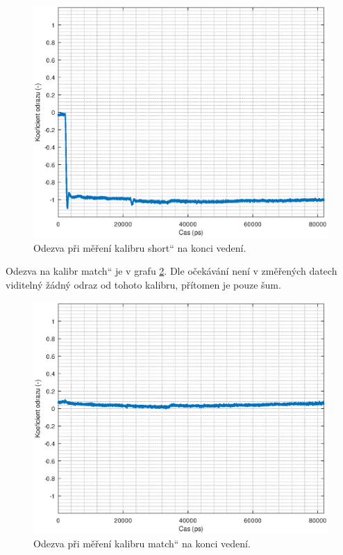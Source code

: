 \begin{figure}[htbp]
\includegraphics[width=\textwidth,keepaspectratio]{images/self-measurements/measured_short.eps}\caption{Odezva při měření kalibru \quotedblbase short\textquotedblleft{} na konci vedení.}\label{measured_short}
\end{figure}

Odezva na kalibr \quotedblbase match\textquotedblleft{} je v grafu \ref{measured_load}. Dle očekávání není v změřených datech viditelný žádný odraz od tohoto kalibru, přítomen je pouze šum.

\begin{figure}[htbp]
\includegraphics[width=\textwidth,keepaspectratio]{images/self-measurements/measured_load.eps}\caption{Odezva při měření kalibru \quotedblbase match\textquotedblleft{} na konci vedení.}\label{measured_load}
\end{figure}